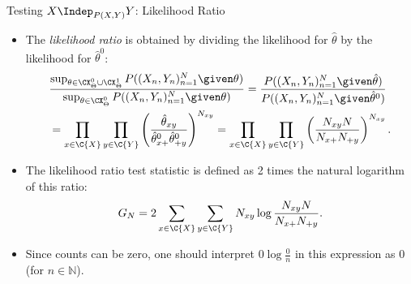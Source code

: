 \begin{frame}{Testing $X \Indep_{P(X,Y)} Y$: Likelihood Ratio}
  \begin{itemize}
    \item The \emph{likelihood ratio} is obtained by dividing the likelihood for $\hat \theta$ by the likelihood for $\hat \theta^0$:
  \begin{equation*}\begin{split}
  & \frac{\sup_{\theta\in\CX_\Theta^0\cup\CX_\Theta^1} P((X_n,Y_n)_{n=1}^N \given \theta)}{\sup_{\theta\in\CX_\Theta^0} P((X_n,Y_n)_{n=1}^N \given \theta)}
    = \frac{P((X_n,Y_n)_{n=1}^N \given \hat\theta)}{P((X_n,Y_n)_{n=1}^N \given \hat\theta^0)} \\
  & = \prod_{x\in\C{X}} \prod_{y\in\C{Y}} \left(\frac{\hat \theta_{xy}}{\hat \theta^0_{x+} \hat \theta^0_{+ y}}\right)^{N_{xy}} 
    = \prod_{x\in\C{X}} \prod_{y\in\C{Y}} \left(\frac{N_{xy} N}{N_{x+} N_{+ y}}\right)^{N_{xy}}.
\end{split}\end{equation*}
\item The likelihood ratio test statistic is defined as 2 times the natural logarithm of this ratio:
\begin{equation*}
  G_N %
  = 2 \sum_{x\in\C{X}} \sum_{y\in\C{Y}} N_{xy} \log \frac{N_{xy} N}{N_{x+} N_{+ y}}.
\end{equation*}
\item Since counts can be zero, one should interpret $0 \log \frac{0}{n}$ in this expression as $0$ (for $n \in \mathbb{N}$).
  \end{itemize}
\end{frame}

